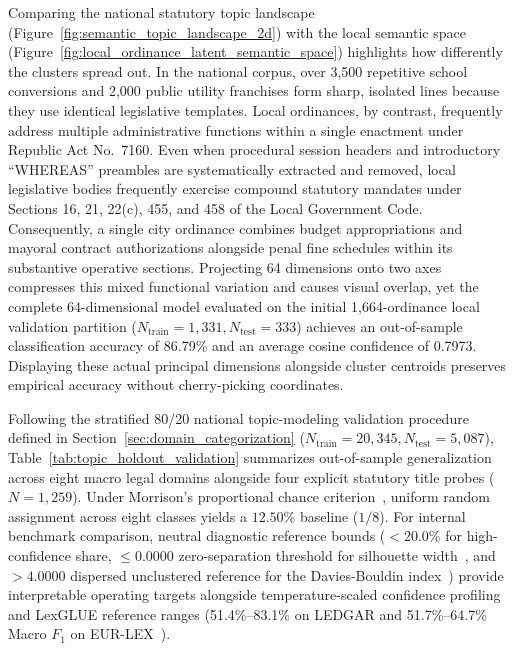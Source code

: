 Comparing the national statutory topic landscape (Figure~\ref{fig:semantic_topic_landscape_2d}) with the local semantic space (Figure~\ref{fig:local_ordinance_latent_semantic_space}) highlights how differently the clusters spread out. In the national corpus, over 3,500 repetitive school conversions and 2,000 public utility franchises form sharp, isolated lines because they use identical legislative templates. Local ordinances, by contrast, frequently address multiple administrative functions within a single enactment under Republic Act No.~7160. Even when procedural session headers and introductory ``WHEREAS'' preambles are systematically extracted and removed, local legislative bodies frequently exercise compound statutory mandates under Sections 16, 21, 22(c), 455, and 458 of the Local Government Code. Consequently, a single city ordinance combines budget appropriations and mayoral contract authorizations alongside penal fine schedules within its substantive operative sections. Projecting 64 dimensions onto two axes compresses this mixed functional variation and causes visual overlap, yet the complete 64-dimensional model evaluated on the initial 1,664-ordinance local validation partition ($N_{\text{train}} = 1{,}331, N_{\text{test}} = 333$) achieves an out-of-sample classification accuracy of 86.79\% and an average cosine confidence of 0.7973. Displaying these actual principal dimensions alongside cluster centroids preserves empirical accuracy without cherry-picking coordinates.

Following the stratified 80/20 national topic-modeling validation procedure defined in Section~\ref{sec:domain_categorization} ($N_{\text{train}} = 20,345, N_{\text{test}} = 5,087$), Table~\ref{tab:topic_holdout_validation} summarizes out-of-sample generalization across eight macro legal domains alongside four explicit statutory title probes ($N = 1,259$). Under Morrison's proportional chance criterion~\cite{morrison1969interpretation}, uniform random assignment across eight classes yields a $12.50\%$ baseline ($1/8$). For internal benchmark comparison, neutral diagnostic reference bounds ($< 20.0\%$ for high-confidence share, $\le 0.0000$ zero-separation threshold for silhouette width~\cite{rousseeuw1987silhouettes}, and $> 4.0000$ dispersed unclustered reference for the Davies-Bouldin index~\cite{davies1979cluster}) provide interpretable operating targets alongside temperature-scaled confidence profiling~\cite{guo2017calibration} and LexGLUE reference ranges (51.4\%--83.1\% on LEDGAR and 51.7\%--64.7\% Macro $F_1$ on EUR-LEX~\cite{chalkidis2022lexglue}).

